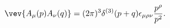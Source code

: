 \begin{equation}
  \vev{A_\mu (p) A_\nu (q)}
  = (2 \pi)^3 \delta^{(3)} (p+q) \epsilon_{\mu \rho \nu}
    \frac{p^\rho}{p^2}.
\label{propagator}
\end{equation}

